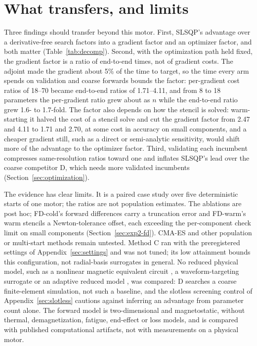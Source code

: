 \documentclass{anvil-paper}
\begin{document}


\section{What transfers, and limits}\label{sec:discussion}
Three findings should transfer beyond this motor. First, SLSQP's advantage
over a derivative-free search factors into a gradient factor and an
optimizer factor, and both matter (Table~\ref{tab:decomp}). Second, with the
optimization path held fixed, the gradient factor is a ratio of
end-to-end times, not of gradient costs. The adjoint made the gradient
about 5\% of the time to target, so the time every arm spends on
validation and coarse forwards bounds the factor: per-gradient cost
ratios of 18--70 became end-to-end ratios of 1.71--4.11, and from 8 to 18
parameters the per-gradient ratio grew about as $n$ while the end-to-end
ratio grew 1.6- to 1.7-fold. The factor also depends on how the stencil is
solved: warm-starting it halved the cost of a stencil solve and cut the
gradient factor from 2.47 and 4.11 to 1.71 and 2.70, at some cost in
accuracy on small components, and a cheaper gradient still, such as a
direct or semi-analytic sensitivity, would shift more of the advantage to
the optimizer factor. Third, validating each incumbent compresses
same-resolution ratios toward one and inflates SLSQP's lead over the
coarse competitor D, which needs more validated incumbents
(Section~\ref{sec:optimization}).

The evidence has clear limits. It is a paired case study over five
deterministic starts of one motor; the ratios are not population estimates.
The ablations are post hoc; FD-cold's forward differences carry a truncation
error and FD-warm's warm stencils a Newton-tolerance offset, each exceeding the
per-component check limit on small components (Section~\ref{sec:exp2-fd}). CMA-ES and other population or
multi-start methods remain untested.
Method C ran with the preregistered settings of
Appendix~\ref{sec:settings} and was not tuned; its low attainment bounds
this configuration, not radial-basis surrogates in general. No reduced
physical model, such as a nonlinear magnetic equivalent circuit
\citep{kemmetmueller2015}, a waveform-targeting surrogate \citep{roomi2022}
or an adaptive reduced model \citep{wen2023}, was compared: D searches a coarse finite-element simulation, not such a baseline, and
the slotless screening control of Appendix~\ref{sec:slotless} cautions
against inferring an advantage from parameter count alone. The forward model is two-dimensional and
magnetostatic, without thermal, demagnetization, fatigue, end-effect or
loss models, and is compared with published computational artifacts, not
with measurements on a physical motor.
\end{document}
